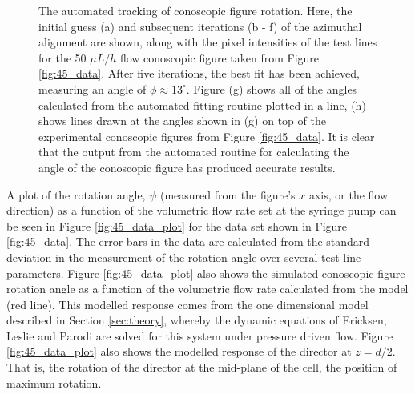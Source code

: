 \begin{figure}
\begin{center}
\end{center}
\caption[Conoscopic figure automated rotation tracking ($\phi_0=45^{\circ}$)]{\label{fig:rotation1} The automated tracking of conoscopic figure rotation. Here, the initial guess (a) and subsequent iterations (b - f) of the azimuthal alignment are shown, along with the pixel intensities of the test lines for the 50 $\mu L/h$ flow conoscopic figure taken from Figure \ref{fig:45_data}. After five iterations, the best fit has been achieved, measuring an angle of $\phi\approx13^{\circ}$. Figure (g) shows all of the angles calculated from the automated fitting routine plotted in a line, (h) shows lines drawn at the angles shown in (g) on top of the experimental conoscopic figures from Figure \ref{fig:45_data}. It is clear that the output from the automated routine for calculating the angle of the conoscopic figure has produced accurate results.}
\end{figure}

A plot of the rotation angle, $\psi$ (measured from the figure's $x$ axis, or the flow direction) as a function of the volumetric flow rate set at the syringe pump can be seen in Figure \ref{fig:45_data_plot} for the data set shown in Figure \ref{fig:45_data}. The error bars in the data are calculated from the standard deviation in the measurement of the rotation angle over several test line parameters. Figure \ref{fig:45_data_plot} also shows the simulated conoscopic figure rotation angle as a function of the volumetric flow rate calculated from the model (red line). This modelled response comes from the one dimensional model described in Section \ref{sec:theory}, whereby the dynamic equations of Ericksen, Leslie and Parodi are solved for this system under pressure driven flow. Figure \ref{fig:45_data_plot} also shows the modelled response of the director at $z=d/2$. That is, the rotation of the director at the mid-plane of the cell, the position of maximum rotation.

